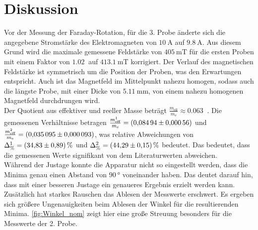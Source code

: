 \section{Diskussion}
\label{sec:Diskussion}


Vor der Messung der Faraday-Rotation, für die 3. Probe änderte sich die angegebene Stromstärke des Elektromagneten von $\SI{10}{\ampere}$ auf $\SI{9.8}{\ampere}$.
Aus diesem Grund wird die maximale gemessene Feldstärke von $\SI{405}{\milli\tesla}$ für die ersten Proben mit einem Faktor von $\SI{1.02}{}$ auf $\SI{413.1}{\milli\tesla}$ korrigiert.
Der Verlauf des magnetischen Feldstärke ist symmetrisch um die Position der Proben, was den Erwartungen entspricht.
Auch ist das Magnetfeld im Mittelpunkt nahezu homogen, sodass auch die längste Probe, mit einer Dicke von $\SI{5.11}{\milli\meter}$, von einem nahezu homogenen Magnetfeld durchdrungen wird.\\

Der Quotient aus effektiver und reeller Masse beträgt  $\frac{m_{\text{eff}}}{m_\text{e}} \approx \SI{0.063}{}$ \cite{GrossMarx+2018}.
Die gemessenen Verhältnisse betragen $\frac{m^1_{\text{eff}}}{m_\text{e}} = \SI{0.08494 \pm 0.00056}{}$ und $\frac{m^2_{\text{eff}}}{m_\text{e}} = \SI{0.035095 \pm 0.000093}{}$,
was relative Abweichungen von $\Delta^1_\text{\%} = \SI{34.83 \pm 0.89}{\%}$ und $\Delta^2_\text{\%} = \SI{44.29 \pm 0.15}{\%}$ bedeutet.
Das bedeutet, dass die gemessenen Werte signifikant von dem Literaturwerten abweichen.\\



Während der Justage konnte die Apparatur nicht so eingestellt werden, dass die Minima genau einen Abstand von $\SI{90}{\degree}$ voneinander haben.
Das deutet darauf hin, dass mit einer besseren Justage ein genaueres Ergebnis erzielt werden kann.
Zusätzlich hat starkes Rauschen das Ablesen der Messwerte erschwert.  
Es ergeben sich größere Ungenauigkeiten beim Ablesen der Winkel für die resultierenden Minima.
\autoref{fig:Winkel_nom} zeigt hier eine große Streuung besonders für die Messwerte der 2. Probe.

